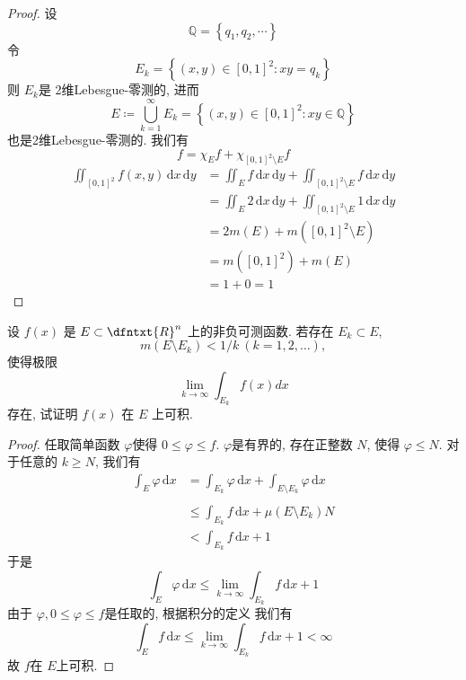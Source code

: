 \documentclass[../main.tex]{subfiles}
\begin{document}
\begin{proof}
     
    设 \[
    \mathbb{Q} = \left\{ q_1,q_2,\cdots  \right\}
    \]令 \[
    E_{k}= \left\{ \left( x,y \right)\in \left[ 0,1 \right]^{2}: xy=  q _{k}   \right\}
    \]则 \(  E_{k}  \)是 2维Lebesgue-零测的, 进而 \[
    E\coloneqq \bigcup _{k= 1}^{\infty}E_{k}= \left\{ \left( x,y \right)\in \left[ 0,1 \right]^{2}:xy\in \mathbb{Q}    \right\}
    \]也是2维Lebesgue-零测的. 我们有 \[
    f= \chi _{E}f+ \chi _{[0,1]^{2}\setminus E}f
    \] \begin{equation}
        \begin{aligned}
              \iint_{[0,1]^{2}}f\left( x,y \right)\,\mathrm{d} x\,\mathrm{d} y&= \iint_{E}f\,\mathrm{d} x\,\mathrm{d} y + \iint_{[0,1]^{2}\setminus E}f\,\mathrm{d} x\,\mathrm{d} y\\ 
               &= \iint_{E}2\,\mathrm{d} x\,\mathrm{d} y+ \iint_{[0,1]^{2}\setminus E}1\,\mathrm{d} x\,\mathrm{d} y\\ 
                &= 2m\left( E \right)+ m\left( [0,1]^{2}\setminus E \right)\\ 
                 &= m\left( [0,1]^{2} \right)+ m\left( E \right)\\ 
                  &= 1+ 0= 1    
        \end{aligned}
    \end{equation}
\end{proof}
\begin{exercise}{}{}
设 $f(x)$ 是 $E \subset \dfntxt{R}^n$ 上的非负可测函数. 若存在 $E_k \subset E$,
\[
m(E \setminus E_k) < 1/k \ (k=1,2,\dots),
\]
使得极限
\[
\lim_{k \to \infty} \int_{E_k} f(x) dx
\]
存在, 试证明 $f(x)$ 在 $E$ 上可积.
\end{exercise}
\begin{proof}
任取简单函数 \(   \varphi   \)使得 \(  0\le  \varphi \le f  \). \(   \varphi   \)是有界的, 存在正整数 \(  N  \), 使得   \(   \varphi \le N  \). 对于任意的 \(  k\ge N  \), 我们有\begin{equation}
    \begin{aligned}
        \int _{E} \varphi \,\mathrm{d} x&= \int_{E_{k}} \varphi \,\mathrm{d} x+ \int_{E\setminus E_{k}} \varphi \,\mathrm{d} x\\ 
         \\ 
          &\le \int_{E_{k}}f\,\mathrm{d} x+ \mu \left( E\setminus E_{k} \right)N\\ 
           &< \int_{E_{k}}f\,\mathrm{d} x+ 1
    \end{aligned}
\end{equation} 
于是 \[
\int_{E} \varphi \,\mathrm{d} x\le \lim_{k\to \infty}\int_{E_{k}}f\,\mathrm{d} x+ 1
\]由于 \(   \varphi , 0\le  \varphi \le f  \)是任取的, 根据积分的定义 我们有 \[
\int_{E}f\,\mathrm{d} x\le \lim_{k\to \infty}\int_{E_{k}}f\,\mathrm{d} x+ 1< \infty
\]故 \(  f  \)在 \(  E  \)上可积.  
\end{proof}
\end{document}
